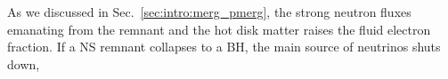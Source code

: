 %
%
%
%
As we discussed in Sec.~\ref{sec:intro:merg_pmerg}, the strong neutron fluxes 
emanating from the remnant and the hot disk matter raises the fluid electron fraction. 
%
If a \ac{NS} remnant collapses to a \ac{BH}, the main source of neutrinos shuts down,  
